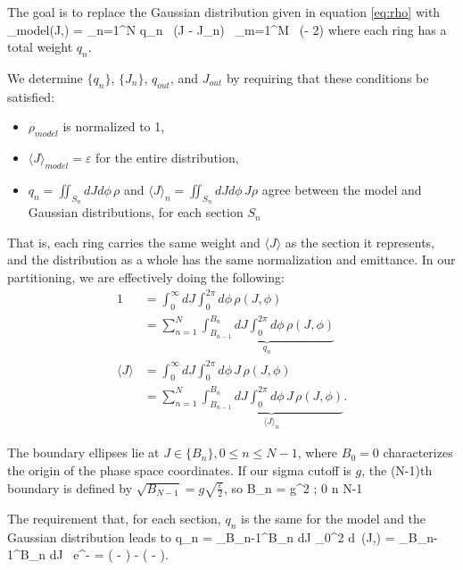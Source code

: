 The goal is to replace the Gaussian distribution given in equation \ref{eq:rho} with 
\Begineq
	\rho_{model}(J,\phi) = \sum_{n=1}^{N} q_{n} \, \delta(J - J_{n}) \, \sum_{m=1}^{M}  \, \delta(\phi - 2\pi {})
	\label{eq:rhomodel}
\Endeq
where each ring has a total weight $q_{n}$.  

We determine $\lbrace q_{n} \rbrace$, $\lbrace J_{n} \rbrace$, $q_{out}$, and $J_{out}$ by requiring that these conditions be satisfied:
\begin{itemize}
\item $\rho_{model}$ is normalized to 1,
\item $\langle J \rangle_{model} = \varepsilon$ for the entire distribution,
\item $q_{n} = \iint_{S_{n}} dJ d\phi \, \rho$ and $\langle J \rangle_{n} = \iint_{S_{n}} dJ d\phi \, J \rho$ agree between the model and Gaussian distributions, for each section $S_{n}$
\end{itemize}
That is, each ring carries the same weight and $\langle J \rangle$ as the section it represents, and the distribution as a whole has the same normalization and emittance.  In our partitioning, we are effectively doing the following:
\begin{align}
	1 & = \int_{0}^{\infty} dJ \int_{0}^{2\pi} d\phi \, \rho(J,\phi)                                                                                         \\
	  & = \sum_{n=1}^{N} \underbrace{\int_{B_{n-1}}^{B_{n}} dJ \int_{0}^{2\pi} d\phi \, \rho(J,\phi)}_{q_{n}}
\\
	\langle J \rangle & = \int_{0}^{\infty} dJ \int_{0}^{2\pi} d\phi \, J \, \rho(J,\phi)                                                                    \\
	                  & = \sum_{n=1}^{N} \underbrace{\int_{B_{n-1}}^{B_{n}} dJ \int_{0}^{2\pi} d\phi \, J \, \rho(J,\phi)}_{\langle J \rangle_{n}}.
\end{align}


The boundary ellipses lie at $J \in \lbrace B_{n} \rbrace, 0 \leq n \leq N-1$, where $B_{0} = 0$ characterizes the origin of the phase space coordinates.  If our sigma cutoff is $g$, the (N-1)th boundary is defined by $\sqrt{B_{N-1}} = g \sqrt{\frac{\varepsilon}{2}}$, so
\Begineq
	B_{n} = g^2  ; 0 \leq n \leq N-1
\Endeq

The requirement that, for each section, $q_n$ is the same for the model and the Gaussian distribution leads to 
\Begineq
	q_{n} = \int_{B_{n-1}}^{B_{n}} dJ \int_{0}^{2\pi} d\phi \, \rho(J,\phi) =  \int_{B_{n-1}}^{B_{n}} dJ \, e^{-} = \exp \left( - \right) - \exp \left( - \right).
\Endeq


